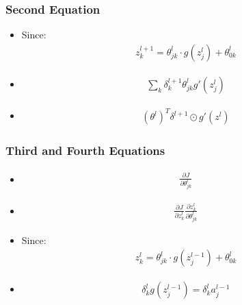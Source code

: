\documentclass{beamer}
\begin{document}
\begin{frame}
    \frametitle{Second Equation}

    \begin{itemize}[<+->]
        \item Since:
        \begin{gather*}
            z_k^{l+1} = \theta_{jk}^{l}\cdot g(z_j^{l}) + \theta_{0k}^{l}
        \end{gather*}
        \item 
        \begin{gather*}
            \sum_k\delta_k^{l+1}\theta_{jk}^{l}g'(z_j^{l})
        \end{gather*}
        \item 
        \begin{gather*}
            (\theta^{l})^T\delta^{l+1} \odot g'(z^{l})
        \end{gather*}
    \end{itemize}

\end{frame}

\begin{frame}
    \frametitle{Third and Fourth Equations}

    \begin{itemize}[<+->]
        \item 
        \begin{gather*}
            \frac{\partial J}{\partial \theta_{jk}^{l}}
        \end{gather*}
        \item 
        \begin{gather*}
            \frac{\partial J}{\partial z_k^{l}}\frac{\partial z_k^{l}}{\partial \theta_{jk}^{l}}
        \end{gather*}
        \item Since:
        \begin{gather*}
            z_k^{l} = \theta_{jk}^{l}\cdot g(z_j^{l-1}) + \theta_{0k}^{l}
        \end{gather*}
        \item 
        \begin{gather*}
            \delta_k^l g(z_j^{l-1}) = \delta_k^l a_j^{l-1}
        \end{gather*}
        
    \end{itemize}
    
\end{frame}
\end{document}
